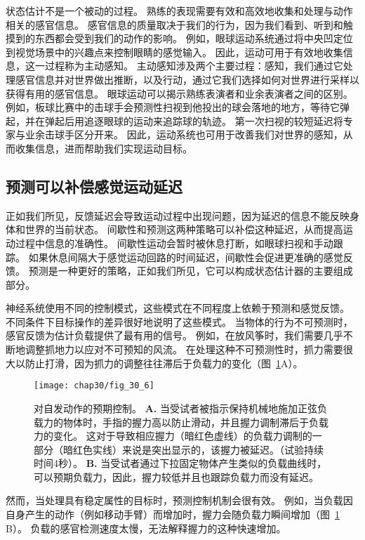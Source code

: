 状态估计不是一个被动的过程。
熟练的表现需要有效和高效地收集和处理与动作相关的感官信息。
感官信息的质量取决于我们的行为，因为我们看到、听到和触摸到的东西都会受到我们的动作的影响。
例如，眼球运动系统通过将中央凹定位到视觉场景中的兴趣点来控制眼睛的感觉输入。
因此，运动可用于有效地收集信息，这一过程称为主动感知。
主动感知涉及两个主要过程：感知，我们通过它处理感官信息并对世界做出推断，以及行动，通过它我们选择如何对世界进行采样以获得有用的感官信息。
眼球运动可以揭示熟练表演者和业余表演者之间的区别。
例如，板球比赛中的击球手会预测性扫视到他投出的球会落地的地方，等待它弹起，并在弹起后用追逐眼球的运动来追踪球的轨迹。
第一次扫视的较短延迟将专家与业余击球手区分开来。
因此，运动系统也可用于改善我们对世界的感知，从而收集信息，进而帮助我们实现运动目标。



\subsection{预测可以补偿感觉运动延迟}

正如我们所见，反馈延迟会导致运动过程中出现问题，因为延迟的信息不能反映身体和世界的当前状态。
间歇性和预测这两种策略可以补偿这种延迟，从而提高运动过程中信息的准确性。
间歇性运动会暂时被休息打断，如眼球扫视和手动跟踪。
如果休息间隔大于感觉运动回路的时间延迟，间歇性会促进更准确的感觉反馈。
预测是一种更好的策略，正如我们所见，它可以构成状态估计器的主要组成部分。


神经系统使用不同的控制模式，这些模式在不同程度上依赖于预测和感觉反馈。
不同条件下目标操作的差异很好地说明了这些模式。
当物体的行为不可预测时，感官反馈为估计负载提供了最有用的信号。
例如，在放风筝时，我们需要几乎不断地调整抓地力以应对不可预知的风流。 
在处理这种不可预测性时，抓力需要很大以防止打滑，因为抓力的调整往往滞后于负载力的变化（图~\ref{fig:30_6}A）。


\begin{figure}[htbp]
	\centering
	\texttt{[image: chap30/fig\_30\_6]}
	\caption{对自发动作的预期控制\cite{blakemore1998predicting}。
		\textbf{A.} 当受试者被指示保持机械地施加正弦负载力的物体时，手指的握力高以防止滑动，并且握力调制滞后于负载力的变化。
		这对于导致相应握力（暗红色虚线）的负载力调制的一部分（暗红色实线）来说是突出显示的，该握力被延迟。（试验持续时间4秒）。
		\textbf{B.} 当受试者通过下拉固定物体产生类似的负载曲线时，可以预期负载力，因此，握力较低并且也跟踪负载力而没有延迟。}
	\label{fig:30_6}
\end{figure}


然而，当处理具有稳定属性的目标时，预测控制机制会很有效。
例如，当负载因自身产生的动作（例如移动手臂）而增加时，握力会随负载力瞬间增加（图~\ref{fig:30_6} B）。
负载的感官检测速度太慢，无法解释握力的这种快速增加。


